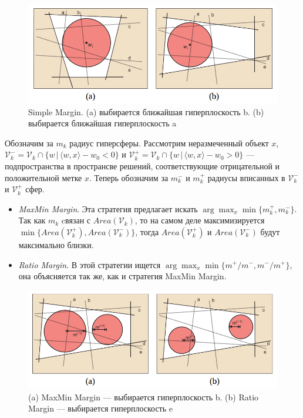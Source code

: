 \documentclass[specialist, 12pt, href]{article}
\begin{document}
\begin{figure}[htbp]
\centering
\includegraphics[width=5in]{img/simplemargin.png}
\caption{Simple Margin. (a) выбирается ближайшая гиперплоскость
b. (b) выбирается ближайшая гиперплоскость a}
\end{figure}

Обозначим за \(m_k\) радиус гиперсферы. Рассмотрим неразмеченный объект
\(x\), 
\(\mathcal{V}_k^- = \mathcal{V}_k \cap \{w\,|\, \langle w, x\rangle - w_0 < 0\}\)
и
\(\mathcal{V}_k^+ = \mathcal{V}_k \cap \{w\,|\, \langle w, x\rangle - w_0 > 0\}\) --- подпространства в
пространсве решений, соответствующие отрицательной и положительной метке
\(x\). Теперь обозначим за \(m^-_k\) и \(m^+_k\) радиусы вписанных в
\(\mathcal{V}_k^-\) и \(\mathcal{V}_k^+\) сфер.


\begin{itemize}
\item
  \emph{MaxMin Margin}. Эта стратегия предлагает искать
  \(\arg\max_x \min\{m^+_k, m^-_k\}\). Так как \(m_k\) cвязан с
  \(Area(\mathcal{V}_k)\), то на самом деле максимизируется
  \(\min\{Area(\mathcal{V}_k^+), Area(\mathcal{V}^-_k)\}\), тогда
  \(Area(\mathcal{V}_k^+)\) и \(Area(\mathcal{V}^-_k)\) будут
  максимально близки.
\item
  \emph{Ratio Margin}. В этой стратегии ищется
  \(\arg\max_x \min\{m^+/m^-, m^-/m^+\}\), она объясняется так же, как и
  стратегия MaxMin Margin.
\end{itemize}

\begin{figure}[htbp]
\centering
\includegraphics[width=5in]{img/maxminmargin.png}
\caption{(a) MaxMin Margin --- выбирается гиперплоскость b. (b)
Ratio Margin --- выбирается гиперплоскость e}
\end{figure}
\end{document}

